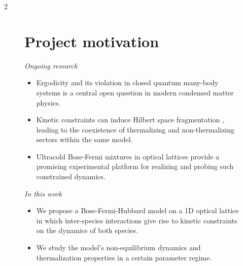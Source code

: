 \documentclass[a0,plainsections]{sciposter}
\begin{document}
\maketitle	%
\vspace*{-20pt}
{\color{rot}{\rule{\textwidth}{4pt}}}

\raggedcolumns
\begin{multicols}{2}

	\addtocounter{figure}{-1}
	\begin{figure}[H]
		\section{Project motivation}
			\begin{minipage}[t]{0.48\textwidth}
				\textit{Ongoing research}
				\begin{itemize}
					\item Ergodicity and its violation in closed quantum many-body systems is a central open question in modern condensed matter physics.
					\item Kinetic constraints can induce Hilbert space fragmentation \cite{will2024}, leading to the coexistence of thermalizing and non-thermalizing sectors within the same model.
					\item Ultracold Bose-Fermi mixtures in optical lattices \cite{demartino2025} provide a promising experimental platform for realizing and probing such constrained dynamics.
				\end{itemize}
			\end{minipage}
			\hfill
			\begin{minipage}[t]{0.48\textwidth}
				\textit{In this work}
				\begin{itemize}
					\item[\textcolor{rot}{$\rightarrow$}] \textcolor{rot}{We propose a Bose-Fermi-Hubbard model on a 1D optical lattice in which inter-species interactions give rise to kinetic constraints on the dynamics of both species.}
					\item[\textcolor{rot}{$\rightarrow$}] \textcolor{rot}{We study the model's non-equilibrium dynamics and thermalization properties in a certain parameter regime.}
				\end{itemize}
			\end{minipage}
	\end{figure}

	\vspace*{10pt}
	\addtocounter{figure}{-2}


\end{multicols}
\end{document}
